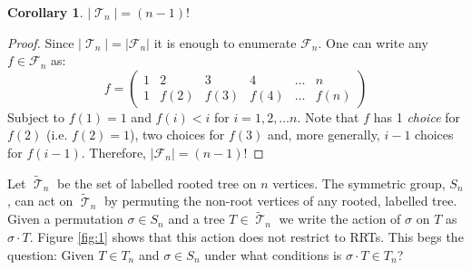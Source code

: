 \documentclass[10pt]{amsart} %
\newtheorem{corol}{Corollary}
\theoremstyle{definition}
\DeclareMathOperator{\T}{\mathcal{T}}
\begin{document}
\begin{corol}
$\lvert \T_n \rvert =  (n-1)!$
\end{corol}
\begin{proof}
 Since $\lvert \T_n \rvert = \lvert \mathcal{F}_n \rvert$ it is enough to enumerate $\mathcal{F}_n$.  One can write any $f \in \mathcal{F}_n$ as:
 \[ f= \left(\begin{array}{cccccc}
     1& 2&3 &4& \dots & n \\
     1 & f(2) &f(3) &f(4) &\dots & f(n)
    \end{array} \right)\]
Subject to  $f(1) = 1$ and $f(i) <i$ for $i = 1,2,\dots n$. Note that $f$ has 1 \emph{choice}  for $f(2)$  (i.e. $f(2) = 1$), two choices for $f(3)$ and, more generally,  $i-1$ choices for $f(i-1)$. Therefore, $ \lvert \mathcal{F}_n \rvert = (n-1)!$ 
\end{proof}

Let $\tilde{\T}_n$ be the set of labelled rooted tree on $n$ vertices.  The symmetric group, $S_n$, can act on $\tilde{\T}_n$ by permuting the non-root vertices of any rooted, labelled tree.  Given a permutation $\sigma \in S_n$ and a tree $T \in \tilde{\T}_n$ we write the action of $\sigma$ on $T$ as $\sigma \cdot T$.  Figure \ref{fig:1} shows that this action does not restrict to RRTs.  This begs the question:  Given $T \in T_n$ and $\sigma \in S_n$ under what conditions is $\sigma  \cdot T \in T_n$?
\end{document}
